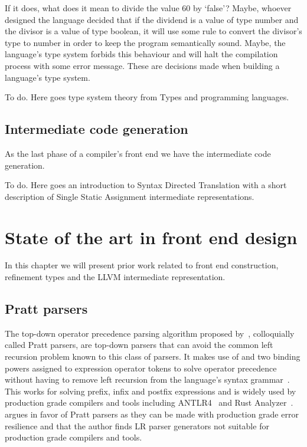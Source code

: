\documentclass[
    oneside,
    english,
    embeddedlogo,
    noabntexcite
]{ufsc-thesis-rn46-2019}
\begin{document}
If it does, what does it mean to divide the value 60 by `false'?
Maybe, whoever designed the language decided that if the dividend is a value of type number and the divisor is a value of type boolean, it will use some rule to convert the divisor's type to number in order to keep the program semantically sound.
Maybe, the language's type system forbids this behaviour and will halt the compilation process with some error message.
These are decisions made when building a language's type system.

To do. Here goes type system theory from Types and programming languages.

\section{Intermediate code generation}\label{chapter:background:sec:intermediate}

As the last phase of a compiler's front end we have the intermediate code generation.

To do. Here goes an introduction to Syntax Directed Translation with a short description of Single Static Assignment intermediate representations.

\chapter{State of the art in front end design}\label{chapter:related_work}

In this chapter we will present prior work related to front end construction, refinement types and the LLVM intermediate representation.
\section{Pratt parsers}

The top-down operator precedence parsing algorithm proposed by~\textcite{pratt1973operatorprecedence}, colloquially called Pratt parsers, are top-down parsers that can avoid the common left recursion problem known to this class of parsers.
It makes use of and two binding powers assigned to expression operator tokens to solve operator precedence without having to remove left recursion from the language's syntax grammar~\cite{pratt1973operatorprecedence}.
This works for solving prefix, infix and postfix expressions and is widely used by production grade compilers and tools including ANTLR4~\cite{Parr13} and Rust Analyzer~\cite{matklad2020prattparsing}.
\textcite{matklad2020challenginglrparsing} argues in favor of Pratt parsers as they can be made with production grade error resilience and that the author finds LR parser generators not suitable for production grade compilers and tools.
\end{document}
